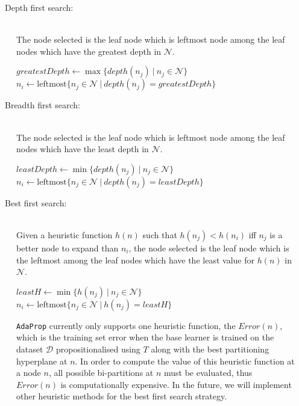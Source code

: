 \documentclass[a4paper,12pt]{article} %
\newcommand{\AdaProp}{\texttt{AdaProp}\xspace}
\newcommand{\mcl}[1]{\mathcal{#1}}
\begin{document}
\begin{description}
\item[~~~Depth first search:] \ \\
    The node selected is the leaf node 
    which is leftmost node among 
    the leaf nodes which have the greatest depth
    in $\mcl{N}$.
\begin{algorithmic}
    \State $ greatestDepth \gets \max\{ depth(n_j) ~\big|~ n_j \in \mcl{N} \} $
    \State $ n_i \gets \textrm{leftmost}\{ n_j \in \mcl{N} ~\big|~ depth(n_j) = greatestDepth \} $
\end{algorithmic}
        
\item[~~~Breadth first search:] \ \\
    The node selected is the leaf node 
    which is leftmost node among 
    the leaf nodes which have the least depth
    in $\mcl{N}$.
\begin{algorithmic}
    \State $ leastDepth \gets \min\{ depth(n_j) ~\big|~ n_j \in \mcl{N} \} $
    \State $ n_i \gets \textrm{leftmost}\{ n_j \in \mcl{N} ~\big|~ depth(n_j) = leastDepth \} $
\end{algorithmic}
    
\item[~~~Best first search:] \ \\
    Given a heuristic function $h(n)$ such that
    $h(n_j) < h(n_i)$ iff $n_j$ is a better node to expand than $n_i$,
    the node selected is the leaf node 
    which is the leftmost among 
    the leaf nodes which have the least value for $h(n)$
    in $\mcl{N}$.
\begin{algorithmic}
    \State $ leastH \gets \min\{ h(n_j) ~\big|~ n_j \in \mcl{N} \} $
    \State $ n_i \gets \textrm{leftmost}\{ n_j \in \mcl{N} ~\big|~ h(n_j) = leastH \} $
\end{algorithmic}

    \AdaProp currently only supports one heuristic function, 
        the $Error(n)$, which is the training set error 
        when the base learner is trained on the dataset $\mcl{D}$
        propositionalised using $T$ along with 
        the best partitioning hyperplane at $n$.
     In order to compute the value of this heuristic function at a node $n$,
         all possible bi-partitions at $n$ must be evaluated,
         thus $Error(n)$ is computationally expensive.
     In the future, we will implement other heuristic methods
         for the best first search strategy.
    
\end{description}
\end{document}
